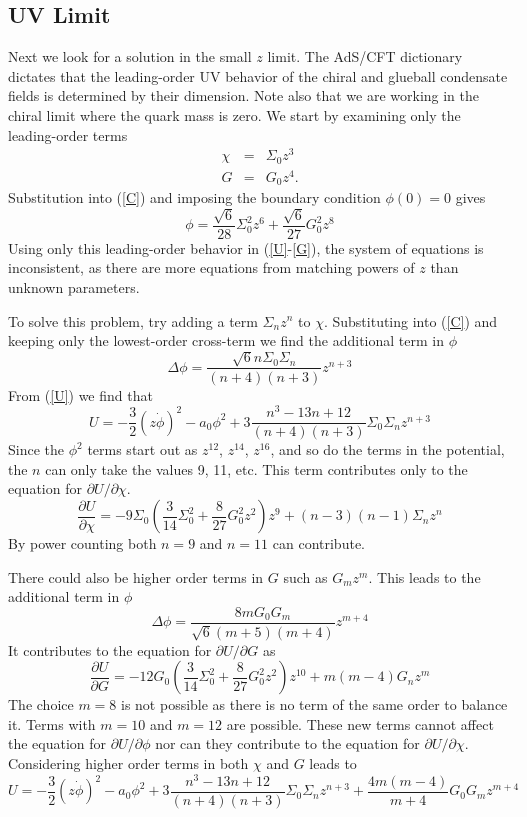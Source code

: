 \documentclass[aps,prd,12pt,nofootinbib]{revtex4}
\newcommand{\be}{\begin{equation}}
\newcommand{\ee}{\end{equation}}
\newcommand{\ba}{\begin{eqnarray}}
\newcommand{\ea}{\end{eqnarray}}
\def\tthalf{{\textstyle{\frac{3}{2}}}}
\def\phidot{\dot{\phi}}
\def\rt6{\sqrt{6}}
\begin{document}
\subsection{UV Limit}

Next we look for a solution in the small $z$ limit. 
The AdS/CFT dictionary dictates that the leading-order UV behavior of the chiral and glueball condensate fields is determined by their dimension. 
Note also that we are working in the chiral limit where the quark mass is zero. 
We start by examining only the leading-order terms
\ba
\chi &=& \Sigma_0 z^3 \\
G &=& G_0 z^4.
\ea
Substitution into (\ref{C}) and imposing the boundary condition $\phi(0)=0$ gives
\be
\phi = \frac{\rt6}{28} \Sigma_0^2 z^6 + \frac{\rt6}{27} G_0^2 z^8
\label{Sz}
\ee
Using only this leading-order behavior in (\ref{U}-\ref{G}), the system of equations is inconsistent, as there are more equations from matching powers of $z$ than unknown parameters. 

To solve this problem, try adding a term $\Sigma_n z^n$ to $\chi$.  
Substituting into (\ref{C}) and keeping only the lowest-order cross-term we find the additional term in $\phi$
\be
\Delta \phi = \frac{\rt6 n \Sigma_0 \Sigma_n}{(n+4)(n+3)} z^{n+3}
\ee
From (\ref{U}) we find that
\be
U = -\tthalf (z\phidot)^2 - a_0\phi^2 +3 \frac{n^3 -13n +12}{(n+4)(n+3)} \Sigma_0 \Sigma_n z^{n+3}
\ee
Since the $\phi^2$ terms start out as $z^{12}$, $z^{14}$, $z^{16}$, and so do the terms in the potential, the $n$ can only take the values 9, 11, etc.  
This term contributes only to the equation for $\partial U/\partial \chi$.
\be
\frac{\partial U}{\partial \chi} = -9\Sigma_0 \left( \frac{3}{14} \Sigma_0^2 + \frac{8}{27} G_0^2 z^2 \right) z^9 + (n-3)(n-1) \Sigma_n z^n
\ee
By power counting both $n=9$ and $n=11$ can contribute.  

There could also be higher order terms in $G$ such as $G_m z^m$.  
This leads to the additional term in $\phi$
\be
\Delta \phi = \frac{8 m G_0 G_m}{\rt6 (m+5)(m+4)} z^{m+4}
\ee
It contributes to the equation for $\partial U/\partial G$ as
\be
\frac{\partial U}{\partial G} = -12G_0 \left( \frac{3}{14} \Sigma_0^2 + \frac{8}{27} G_0^2 z^2 \right) z^{10}
+ m (m-4) G_n z^m
\ee
The choice $m=8$ is not possible as there is no term of the same order to balance it.  
Terms with $m=10$ and $m=12$ are possible.  
These new terms cannot affect the equation for $\partial U/\partial \phi$  nor can they contribute to the equation for $\partial U/\partial \chi$.  
Considering higher order terms in both $\chi$ and $G$ leads to
\be
U = -\tthalf (z\phidot)^2 - a_0\phi^2 +3 \frac{n^3 -13n +12}{(n+4)(n+3)} \Sigma_0 \Sigma_n z^{n+3}
+ \frac{4m(m-4)}{m+4} G_0 G_m z^{m+4}
\ee 
\end{document}
